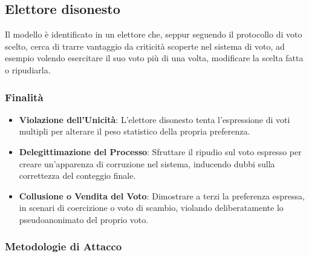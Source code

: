\documentclass[a4paper,12pt]{article}
\begin{document}
\subsection{Elettore disonesto}

Il modello è identificato in un elettore che, seppur seguendo il protocollo di voto scelto, cerca di trarre vantaggio da criticità scoperte nel sistema di voto, ad esempio volendo esercitare il suo voto più di una volta, modificare la scelta fatta o ripudiarla.

\subsubsection*{Finalità}

\begin{itemize}
    \item \textbf{Violazione dell'Unicità}: L'elettore disonesto tenta l'espressione di voti multipli per alterare il peso statistico della propria preferenza.

    \item \textbf{Delegittimazione del Processo}: Sfruttare il ripudio sul voto espresso per creare un'apparenza di corruzione nel sistema, inducendo dubbi sulla correttezza del conteggio finale.

    \item \textbf{Collusione o Vendita del Voto}: Dimostrare a terzi la preferenza espressa, in scenari di coercizione o voto di scambio, violando deliberatamente lo pseudoanonimato del proprio voto.
\end{itemize}

\subsubsection*{Metodologie di Attacco}
\end{document}
